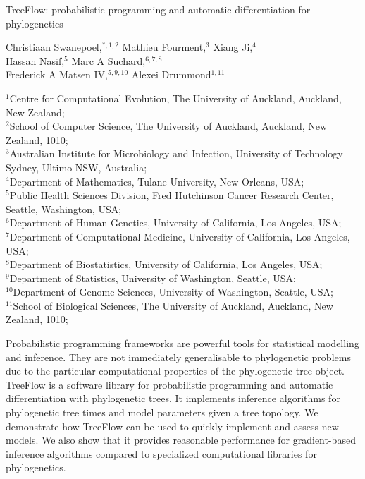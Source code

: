 
TreeFlow: probabilistic programming and automatic differentiation for phylogenetics

Christiaan Swanepoel,$^{\ast, 1, 2}$
Mathieu Fourment,$^{3}$
Xiang Ji,$^{4}$\\
Hassan Nasif,$^{5}$
Marc A Suchard,$^{6,7,8}$\\
Frederick A Matsen IV,$^{5,9,10}$
Alexei Drummond$^{1,11}$

${^1}$Centre for Computational Evolution, The University of Auckland, Auckland, New Zealand;\\
$^{2}$School of Computer Science, The University of Auckland, Auckland, New Zealand, 1010;\\
$^{3}$Australian Institute for Microbiology and Infection, University of Technology Sydney, Ultimo NSW, Australia;\\
$^{4}$Department of Mathematics, Tulane University, New Orleans, USA;\\
$^{5}$Public Health Sciences Division, Fred Hutchinson Cancer Research Center, Seattle, Washington, USA;\\
$^{6}$Department of Human Genetics, University of California, Los Angeles, USA;\\
$^{7}$Department of Computational Medicine, University of California, Los Angeles, USA;\\
$^{8}$Department of Biostatistics, University of California, Los Angeles, USA;\\
$^{9}$Department of Statistics, University of Washington, Seattle, USA;\\
$^{10}$Department of Genome Sciences, University of Washington, Seattle, USA;\\
$^{11}$School of Biological Sciences, The University of Auckland, Auckland, New Zealand, 1010;\\

\usepackage{booktabs}
\usepackage[outputdir=]{minted}
\usepackage{multirow}
\usepackage{setspace}
\usepackage[T1]{fontenc}
\setcounter{secnumdepth}{0}

Probabilistic programming frameworks are powerful tools for statistical modelling and inference. They are not immediately generalisable to phylogenetic problems due to the particular computational properties of the phylogenetic tree object. TreeFlow is a software library for probabilistic programming and automatic differentiation with phylogenetic trees. It implements inference algorithms for phylogenetic tree times and model parameters given a tree topology. We demonstrate how TreeFlow can be used to quickly implement and assess new models. We also show that it provides reasonable performance for gradient-based inference algorithms compared to specialized computational libraries for phylogenetics.


